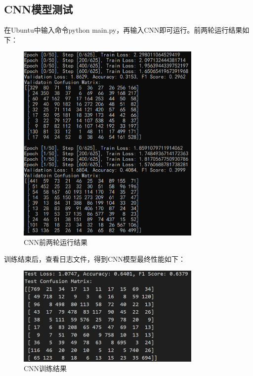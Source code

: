 \documentclass[UTF8]{ctexart}
\begin{document}
\subsection{CNN模型测试}
在Ubuntu中输入命令python main.py，再输入CNN即可运行。前两轮运行结果如下：
\begin{figure}[h]
    \centering
    \includegraphics[width=0.8\textwidth]{CNN_run.png}
    \caption*{CNN前两轮运行结果}
\end{figure}

\newpage

训练结束后，查看日志文件，得到CNN模型最终性能如下：
\begin{figure}[h]
    \centering
    \includegraphics[width=0.8\textwidth]{CNN_res.png}
    \caption*{CNN训练结果}
\end{figure}
\end{document}
